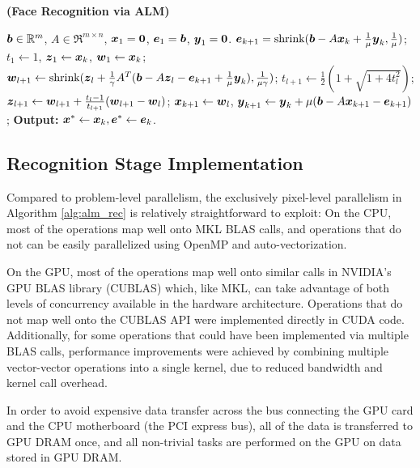\begin{algorithm}[t]
\caption{\bf (Face Recognition via ALM)} \label{alg:alm_rec} 
\begin{algorithmic}[1]
\begin{small}
 $\boldsymbol{b} \in \mathbb R^m$, $A \in \Re^{m \times n}$,
${\boldsymbol{x}}_1 = \boldsymbol{0}$, $\boldsymbol{e}_1 = \boldsymbol{b}$, ${\boldsymbol{y}}_1 =
\boldsymbol{0}$.
\STATE $\boldsymbol{e}_{k+1} = {\text{shrink}}(\boldsymbol{b} - A{\boldsymbol{x}}_k +
\frac{1}{\mu}{\boldsymbol{y}}_k, \frac{1}{\mu})$;
\STATE $t_1\leftarrow 1$, $\boldsymbol{z}_1 \leftarrow {\boldsymbol{x}}_k$, $\boldsymbol{w}_1 \leftarrow {\boldsymbol{x}}_k$;
\STATE $\boldsymbol{w}_{l+1} \leftarrow {\text{shrink}}(\boldsymbol{z}_l +
\frac{1}{\gamma}A^T(\boldsymbol{b} - A\boldsymbol{z}_l - \boldsymbol{e}_{k+1} +
\frac{1}{\mu}{\boldsymbol{y}}_k), \frac{1}{\mu\gamma})$;
\STATE $t_{l+1} \leftarrow \frac{1}{2}( 1 +
\sqrt{1+4t_l^2})$;
\STATE $\boldsymbol{z}_{l+1} \leftarrow \boldsymbol{w}_{l+1} + \frac{t_l - 1}{t_{l+1}}(\boldsymbol{w}_{l+1} - \boldsymbol{w}_l)$;
\ENDWHILE
\STATE ${\boldsymbol{x}}_{k+1} \leftarrow \boldsymbol{w}_{l}$,  \; ${\boldsymbol{y}}_{k+1} \leftarrow {\boldsymbol{y}}_k + \mu (\boldsymbol{b} - A{\boldsymbol{x}}_{k+1} - \boldsymbol{e}_{k+1})$;
\ENDWHILE \STATE
{\bf Output:} ${\boldsymbol{x}}^* \leftarrow {\boldsymbol{x}}_k, \boldsymbol{e}^* \leftarrow \boldsymbol{e}_k$.
\end{small}
\end{algorithmic}
\end{algorithm}

\subsection{Recognition Stage Implementation} 
Compared to problem-level
parallelism, the exclusively pixel-level parallelism in Algorithm \ref{alg:alm_rec} is
relatively straightforward to exploit:  
On the CPU, most of the operations map
well onto MKL BLAS calls, and operations that do not can be easily
parallelized using OpenMP and auto-vectorization.

On the GPU, most of the operations map well onto similar calls in NVIDIA's GPU
BLAS library (CUBLAS) which, like MKL, can take advantage of both levels of
concurrency available in the hardware architecture.  Operations that do not map
well onto the CUBLAS API were implemented directly in CUDA code.
Additionally, for some operations that could have been implemented via multiple
BLAS calls, performance improvements were achieved by combining multiple
vector-vector operations into a single kernel, due to reduced bandwidth and
kernel call overhead.  

In order to avoid expensive data transfer across the bus connecting the GPU
card and the CPU motherboard (the PCI express bus), all of the data is
transferred to GPU DRAM once, and all non-trivial tasks are performed on the
GPU on data stored in GPU DRAM.  

